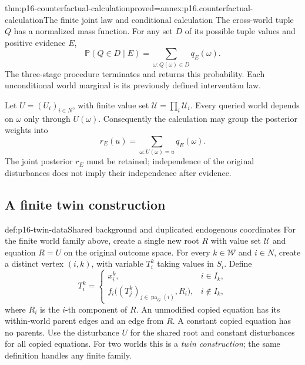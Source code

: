 \begin{hbtheorem}{thm:p16-counterfactual-calculation}{proved=annex:p16.counterfactual-calculation}{The finite joint law and conditional calculation}
The cross-world tuple \(Q\) has a normalized mass function. For
any set \(D\) of its possible tuple values and positive evidence \(E\),
\[
 \mathbb P(Q\in D\mid E)
     =\sum_{\omega:Q(\omega)\in D}q_E(\omega).
\]
The three-stage procedure terminates and returns this probability.
Each unconditional world marginal is its previously defined intervention law.

Let \(U=(U_i)_{i\in N}\), with finite value set
\(\mathcal U=\prod_i\mathcal U_i\). Every queried world depends
on \(\omega\) only through \(U(\omega)\). Consequently the
calculation may group the posterior weights into
\[
 r_E(u)=\sum_{\omega:U(\omega)=u}q_E(\omega).
\]
The joint posterior \(r_E\) must be retained; independence of the
original disturbances does not imply their independence after evidence.
\end{hbtheorem}

\subsection{A finite twin construction}

\begin{hbdefinition}{def:p16-twin-data}{Shared background and duplicated endogenous coordinates}
For the finite world family above, create a single new root \(R\)
with value set \(\mathcal U\) and equation \(R=U\) on the
original outcome space. For every \(k\in\mathcal W\) and
\(i\in N\), create a distinct vertex \((i,k)\), with variable
\(T_i^k\) taking values in \(S_i\). Define
\[
 T_i^k=
 \begin{cases}
 x_i^k,&i\in I_k,\\
 f_i\bigl((T_j^k)_{j\in\operatorname{pa}_G(i)},R_i\bigr),
       &i\notin I_k,
 \end{cases}
\]
where \(R_i\) is the \(i\)-th component of \(R\).
An unmodified copied equation has its within-world parent edges
and an edge from \(R\). A constant copied equation has no parents.
Use the disturbance \(U\) for the shared root and constant
disturbances for all copied equations. For two worlds this is a
\emph{twin construction}; the same definition handles any finite family.
\end{hbdefinition}

